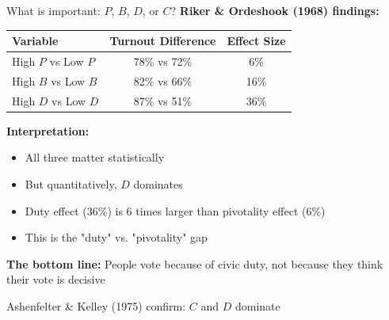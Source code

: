 \documentclass[10pt]{beamer}
\begin{document}
\begin{frame}{What is important: $P$, $B$, $D$, or $C$?}
\textbf{Riker \& Ordeshook (1968) findings:}


\begin{table}
\centering
\begin{tabular}{lcc}
\toprule
\textbf{Variable} & \textbf{Turnout Difference} & \textbf{Effect Size} \\
\midrule
High $P$ vs Low $P$ & 78\% vs 72\% & 6\% \\
High $B$ vs Low $B$ & 82\% vs 66\% & 16\% \\
High $D$ vs Low $D$ & \alert{87\% vs 51\%} & \alert{36\%} \\
\bottomrule
\end{tabular}
\end{table}


\textbf{Interpretation:}
\begin{itemize}
\item All three matter statistically
\item But quantitatively, $D$ dominates
\item \alert{Duty effect (36\%) is 6 times larger than pivotality effect (6\%)}
\item This is the "duty" vs. "pivotality" gap
\end{itemize}


\textbf{The bottom line:} People vote because of civic duty, not because they think their vote is decisive


\footnotesize{Ashenfelter \& Kelley (1975) confirm: $C$ and $D$ dominate}
\end{frame}
\end{document}
